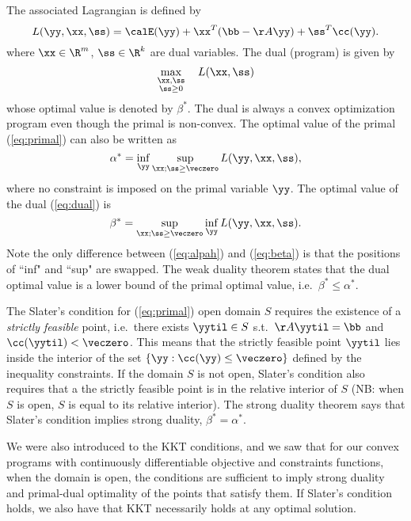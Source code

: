 The associated Lagrangian is defined by
\[
  L(\yy, \xx, \ss) = \calE(\yy) + \xx^T(\bb-\AA\yy) + \ss^T\cc(\yy).
\]
where $\xx \in \R^m$, $\ss \in \R^k$ are dual variables. The dual (program) is given by
\begin{equation}
  \label{eq:dual}
  \max_{\substack{\xx, \ss \\ \ss \geq 0}} \quad L(\xx,  \ss)
\end{equation}
whose optimal value is denoted by $\beta^*$. The dual is always a convex optimization program even though the primal is non-convex.
The optimal value of the primal (\ref{eq:primal}) can also be written as
\begin{equation}\label{eq:alpah}
  \alpha^* = \inf_{\yy} \sup_{\xx; \ss\geq\veczero} L(\yy, \xx, \ss),
\end{equation}
where no constraint is imposed on the primal variable $\yy$.
The optimal value of the dual (\ref{eq:dual}) is
\begin{equation}\label{eq:beta}
  \beta^* = \sup_{\xx; \ss\geq\veczero} \inf_{\yy} L(\yy, \xx, \ss).
\end{equation}
Note the only difference between (\ref{eq:alpah}) and (\ref{eq:beta}) is that the positions of ``inf" and ``sup" are swapped.
The weak duality theorem states that the dual optimal value is a lower bound of the primal optimal value, i.e.\ $\beta^* \leq \alpha^*$.

The Slater's condition for (\ref{eq:primal}) open domain $S$ requires the existence of a \emph{strictly feasible} point, i.e.\ there exists $\yytil\in S$ s.t.\ $\AA\yytil = \bb$ and $\cc(\yytil) < \veczero$.
This means that the strictly feasible point $\yytil$ lies inside the
interior of the set $\{\yy : \cc(\yy) \leq \veczero\}$ defined by the
inequality constraints.
If the domain $S$ is not open, Slater's condition also requires that a
the strictly feasible point is in the relative interior of $S$ (NB:
when $S$ is open, $S$ is equal to its relative interior).
The strong duality theorem says that Slater's condition implies strong
duality, $\beta^* = \alpha^*$.

We were also introduced to the KKT conditions, and we saw that for our
convex programs with continuously differentiable objective and
constraints functions, when the domain is open, the conditions are sufficient to
imply strong duality and primal-dual optimality of the points that
satisfy them.
If Slater's condition holds, we also have that KKT necessarily holds
at any optimal solution.

